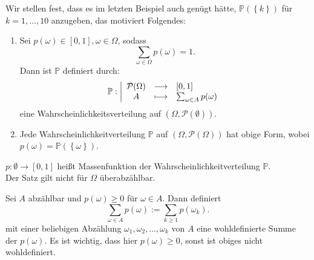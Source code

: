 Wir stellen fest, dass es im letzten Beispiel auch genügt hätte, $\mathbb{P}(\left \{k\right\} )$ für $k=1,\ldots,10$ anzugeben, das motiviert Folgendes:
\begin{theorem}
    \begin{enumerate}[label=\protect\circled{\alph*}]
        \item Sei $p(\omega)\in [0,1], \omega\in \Omega$, sodass
            \[
                \sum_{\omega\in \Omega}p(\omega) = 1
            .\] 
            Dann ist $\mathbb{P}$ definiert durch:
                \begin{equation*}
                \mathbb{P}: \left| \begin{array}{c c l} 
                    \mathcal{P}(\Omega) & \longrightarrow & [0,1] \\
                    A & \longmapsto &  \sum_{\omega\in A}p(\omega)
                \end{array} \right.
            \end{equation*}
            eine Wahrscheinlichkeitsverteilung auf $(\Omega,\mathcal{P}(\emptyset))$. 
        \item Jede Wahrscheinlichkeitverteilung $\mathbb{P}$ auf $(\Omega,\mathcal{P}(\Omega))$ hat obige Form, wobei $p(\omega) = \mathbb{P}(\left \{\omega\right\} )$.
    \end{enumerate}
\end{theorem}

\begin{remark}
    $p:\emptyset\to [0,1]$ heißt Massenfunktion der Wahrscheinlichkeitverteilung $\mathbb{P}$. \\
    \warning Der Satz gilt nicht für $\Omega$ überabzählbar.
\end{remark}


\begin{remark}
    Sei $A$ abzählbar und  $p(\omega) \geq 0$ für $\omega\in A$. Dann definiert
    \[
        \sum_{\omega\in A} p(\omega) := \sum_{k\geq 1} p(\omega_k)
    .\] 
    mit einer beliebigen Abzählung $\omega_1,\omega_2, \ldots, \omega_k$ von $A$ eine wohldefinierte Summe der  $p(\omega)$. Es ist wichtig, dass hier $p(\omega) \geq 0$, sonst ist obiges nicht wohldefiniert.
\end{remark}

